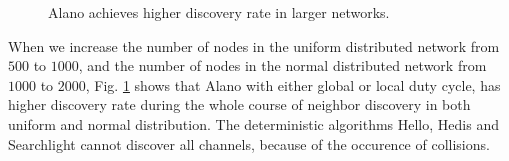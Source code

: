 \begin{figure}[!h]

\hspace{0.01in}
\hspace{0.01in}
\hspace{0.01in}
\caption{Alano achieves higher discovery rate in larger networks.}
\label{fig_timerate_large}
\end{figure}



When we increase the number of nodes in the uniform distributed  network from $500$ to $1000$, and the number of nodes in the normal distributed network from $1000$ to $2000$, Fig. \ref{fig_timerate_large} shows that Alano with either global or local duty cycle, has higher discovery rate during the whole course of neighbor discovery in both uniform and normal distribution. The deterministic algorithms Hello, Hedis and Searchlight cannot discover all channels, because of the occurence of collisions. 





